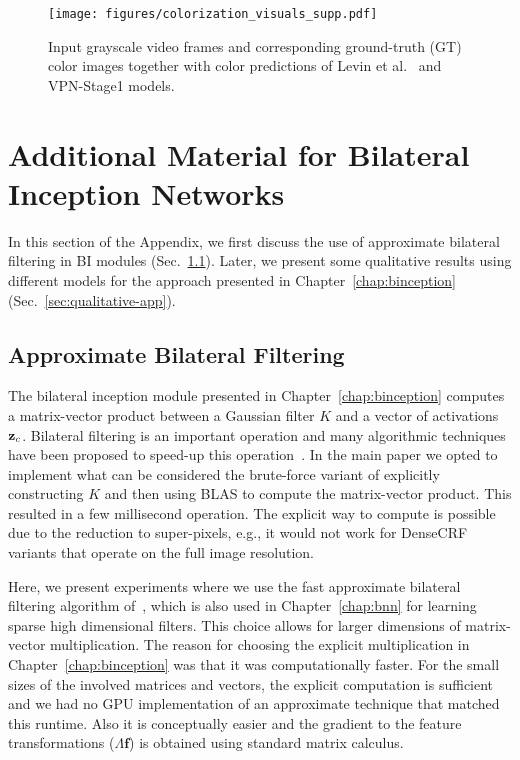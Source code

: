 \begin{figure}[th!]
\begin{center}
  \centerline{\texttt{[image: figures/colorization\_visuals\_supp.pdf]}}
  {Input grayscale video frames and corresponding ground-truth (GT) color images
  together with color predictions of Levin et al.~\cite{levin2004colorization} and VPN-Stage1 models.}
  \label{fig:color_visuals_supp}
\end{center}
\vspace{-0.7cm}
\end{figure}

\clearpage

\section{Additional Material for Bilateral Inception Networks}
\label{sec:binception-app}

In this section of the Appendix, we first discuss the use of approximate bilateral
filtering in BI modules (Sec.~\ref{sec:lattice}).
Later, we present some qualitative results using different models for the approach presented in
Chapter~\ref{chap:binception} (Sec.~\ref{sec:qualitative-app}).

\subsection{Approximate Bilateral Filtering}
\label{sec:lattice}

The bilateral inception module presented in Chapter~\ref{chap:binception} computes a matrix-vector
product between a Gaussian filter $K$ and a vector of activations $\mathbf{z}_c$.
Bilateral filtering is an important operation and many algorithmic techniques have been
proposed to speed-up this operation~\cite{paris2006fast,adams2010fast,gastal2011domain}.
In the main paper we opted to implement what can be considered the
brute-force variant of explicitly constructing $K$ and then using BLAS to compute the
matrix-vector product. This resulted in a few millisecond operation.
The explicit way to compute is possible due to the
reduction to super-pixels, e.g., it would not work for DenseCRF variants
that operate on the full image resolution.

Here, we present experiments where we use the fast approximate bilateral filtering
algorithm of~\cite{adams2010fast}, which is also used in Chapter~\ref{chap:bnn}
for learning sparse high dimensional filters. This
choice allows for larger dimensions of matrix-vector multiplication. The reason for choosing
the explicit multiplication in Chapter~\ref{chap:binception} was that it was computationally faster.
For the small sizes of the involved matrices and vectors, the explicit computation is sufficient and we had no
GPU implementation of an approximate technique that matched this runtime. Also it
is conceptually easier and the gradient to the feature transformations ($\Lambda \mathbf{f}$) is
obtained using standard matrix calculus.

